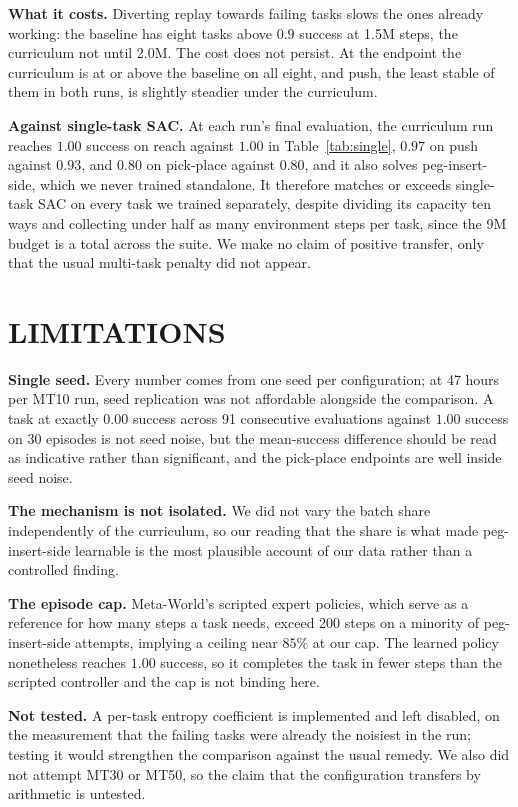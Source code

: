 \documentclass[letterpaper, 10 pt, conference]{ieeeconf}
\begin{document}
\textbf{What it costs.} Diverting replay towards failing tasks slows the ones already
working: the baseline has eight tasks above $0.9$ success at 1.5M steps, the curriculum not
until 2.0M. The cost does not persist. At the endpoint the curriculum is at or above the
baseline on all eight, and push, the least stable of them in both runs, is slightly steadier
under the curriculum.

\textbf{Against single-task SAC.} At each run's final evaluation, the curriculum run
reaches $1.00$ success on reach against $1.00$ in Table~\ref{tab:single}, $0.97$ on push
against $0.93$, and $0.80$ on pick-place against $0.80$, and it also solves peg-insert-side,
which we never trained standalone. It therefore matches or exceeds single-task SAC on every
task we trained separately, despite dividing its capacity ten ways and collecting under half as
many environment steps per task, since the 9M budget is a total across the suite. We make no
claim of positive transfer, only that the usual multi-task penalty did not appear.

\section{LIMITATIONS}

\textbf{Single seed.} Every number comes from one seed per configuration; at 47 hours per
MT10 run, seed replication was not affordable alongside the comparison. A task at exactly
$0.00$ success across 91 consecutive evaluations against $1.00$ success on 30 episodes is not
seed noise, but the mean-success difference should be read as indicative rather than
significant, and the pick-place endpoints are well inside seed noise.

\textbf{The mechanism is not isolated.} We did not vary the batch share independently of
the curriculum, so our reading that the share is what made peg-insert-side learnable is the
most plausible account of our data rather than a controlled finding.

\textbf{The episode cap.} Meta-World's scripted expert policies, which serve as a
reference for how many steps a task needs, exceed 200 steps on a minority of peg-insert-side
attempts, implying a ceiling near $85\%$ at our cap. The learned policy nonetheless reaches
$1.00$ success, so it completes the task in fewer steps than the scripted controller and the
cap is not binding here.

\textbf{Not tested.} A per-task entropy coefficient is implemented and left disabled, on
the measurement that the failing tasks were already the noisiest in the run; testing it would
strengthen the comparison against the usual remedy. We also did not attempt MT30 or MT50, so
the claim that the configuration transfers by arithmetic is untested.
\end{document}

